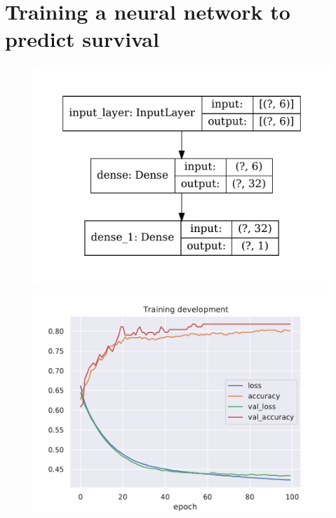 \documentclass{book}
\begin{document}
\section*{Training a neural network to predict survival}
\begin{figure}[h]
    \centering
    \includegraphics[scale=.4]{../figs/model.pdf}
    \includegraphics[scale=.65]{../figs/training_development.pdf}
\end{figure}

\end{document}
